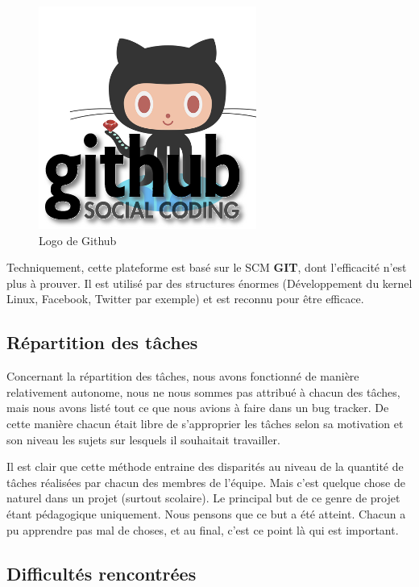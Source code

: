 \documentclass{report}
\begin{document}
    \begin{figure}[h]
    \begin{center}
        \includegraphics{./githublogo.png}
        \caption{Logo de Github}
        \end{center}
    \end{figure}
    
    Techniquement, cette plateforme est basé sur le SCM \textbf{GIT}, dont
    l'efficacité n'est plus à prouver. Il est utilisé par des structures énormes
    (Développement du kernel Linux, Facebook, Twitter par exemple) et est reconnu 
    pour être efficace.
      
    \subsection{Répartition des tâches}
  	  Concernant la répartition des tâches, nous avons fonctionné de manière
   relativement autonome, nous ne nous sommes pas attribué à chacun des tâches,
   mais nous avons listé tout ce que nous avions à faire dans un bug tracker.
   De cette manière chacun était libre de s'approprier les tâches selon sa 
   motivation et son niveau les sujets sur lesquels il souhaitait travailler.
     
     Il est clair que cette méthode entraine des disparités au niveau de la quantité
   de tâches réalisées par chacun des membres de l'équipe. Mais c'est quelque 
   chose de naturel dans un projet (surtout scolaire). Le principal but de ce
   genre de projet étant pédagogique uniquement. Nous pensons que ce but a été
   atteint. Chacun a pu apprendre pas mal de choses, et au final, c'est ce
   point là qui est important.
  
  \subsection{Difficultés rencontrées}
\end{document}
